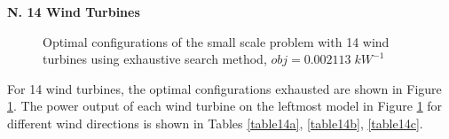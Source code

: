     \textbf{N. 14 Wind Turbines}
        \begin{figure}[H]
            \centering
            \qquad
            \qquad
            \qquad
            \caption{Optimal configurations of the small scale problem with 14 wind turbines using exhaustive search method, $obj=0.002113\;kW^{-1}$}
            \label{small14}
        \end{figure}
        
        For 14 wind turbines, the optimal configurations exhausted are shown in Figure \ref{small14}. The power output of each wind turbine on the leftmost model in Figure \ref{small14} for different wind directions is shown in Tables \ref{table14a}, \ref{table14b}, \ref{table14c}.
        
